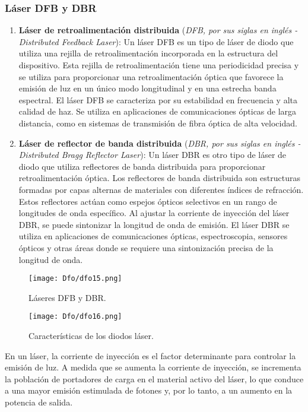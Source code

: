 \documentclass[12pt,fleqn,a4paper,oneside]{LegrandOrangeBook}
\begin{document}
\subsubsection{Láser DFB y DBR}
\begin{enumerate}
\item \textbf{Láser de retroalimentación distribuida} (\textit{DFB, por sus siglas en inglés - Distributed Feedback Laser}): Un láser DFB es un tipo de láser de diodo que utiliza una rejilla de retroalimentación incorporada en la estructura del dispositivo. Esta rejilla de retroalimentación tiene una periodicidad precisa y se utiliza para proporcionar una retroalimentación óptica que favorece la emisión de luz en un único modo longitudinal y en una estrecha banda espectral. El láser DFB se caracteriza por su estabilidad en frecuencia y alta calidad de haz. Se utiliza en aplicaciones de comunicaciones ópticas de larga distancia, como en sistemas de transmisión de fibra óptica de alta velocidad.
\item \textbf{Láser de reflector de banda distribuida} (\textit{DBR, por sus siglas en inglés - Distributed Bragg Reflector Laser}): Un láser DBR es otro tipo de láser de diodo que utiliza reflectores de banda distribuida para proporcionar retroalimentación óptica. Los reflectores de banda distribuida son estructuras formadas por capas alternas de materiales con diferentes índices de refracción. Estos reflectores actúan como espejos ópticos selectivos en un rango de longitudes de onda específico. Al ajustar la corriente de inyección del láser DBR, se puede sintonizar la longitud de onda de emisión. El láser DBR se utiliza en aplicaciones de comunicaciones ópticas, espectroscopia, sensores ópticos y otras áreas donde se requiere una sintonización precisa de la longitud de onda.
\end{enumerate}
\begin{figure}[H]
\centering
\texttt{[image: Dfo/dfo15.png]}
\caption{Láseres DFB y DBR.}
\end{figure}
\begin{figure}[H]
\centering
\texttt{[image: Dfo/dfo16.png]}
\caption{Características de los diodos láser.}
\end{figure}
En un láser, la corriente de inyección es el factor determinante para controlar la emisión de luz. A medida que se aumenta la corriente de inyección, se incrementa la población de portadores de carga en el material activo del láser, lo que conduce a una mayor emisión estimulada de fotones y, por lo tanto, a un aumento en la potencia de salida. \\
\end{document}
